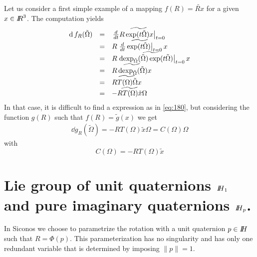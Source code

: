Let us consider a first simple example of a mapping $f(R) = \widetilde{R  x}$ for a given $x\in\mbox{\rm $I\!\!R$}^3$. The computation yields
\begin{equation}
  \label{eq:181}
  \begin{array}{rcl}
    \operatorname{d} f_R (\tilde\Omega) &=& \widetilde{ \left.\frac{d}{dt} R \exp(t \tilde\Omega) x  \right|_{t=0}} \\
                           &=& \widetilde{R \left.\frac{d}{dt}\exp(t \tilde\Omega)\right|_{t=0}  x} \\
                           &=& \widetilde{R \left. \operatorname{dexp}_{\tilde\Omega}(\tilde\Omega)\exp(t \tilde\Omega) \right|_{t=0}  x} \\
                           &=& \widetilde{R \operatorname{dexp}_{\tilde\Omega}(\tilde\Omega) x} \\
                           &=& \widetilde{R T(\Omega) \tilde\Omega  x} \\
                           &=& \widetilde{-R T(\Omega) \tilde x \Omega }
  \end{array}
\end{equation}
In that case, it is difficult to find a expression as in \eqref{eq:180}, but considering the function $g(R)$ such that $f(R) = \widetilde g(x)$ we get
\begin{equation}
  \label{eq:181}
  \begin{array}{rcl}
    \dd g_R (\tilde\Omega)  =- R T(\Omega) \tilde x \Omega  = C(\Omega) \Omega
  \end{array}
\end{equation}
with
\begin{equation}
  \label{eq:182}
   C(\Omega) = -R T(\Omega) \tilde x
\end{equation}


\section{Lie group of unit quaternions $\mbox{\rm $I\!\!H$}_1$ and pure imaginary quaternions $\mbox{\rm $I\!\!H$}_p$.}


In Siconos we choose to parametrize the rotation with a unit quaternion $p \in \mbox{\rm $I\!\!H$}$ such that $R = \Phi(p)$. This parameterization has no singularity and has only one redundant variable that is determined by imposing $\|p\|=1$.


